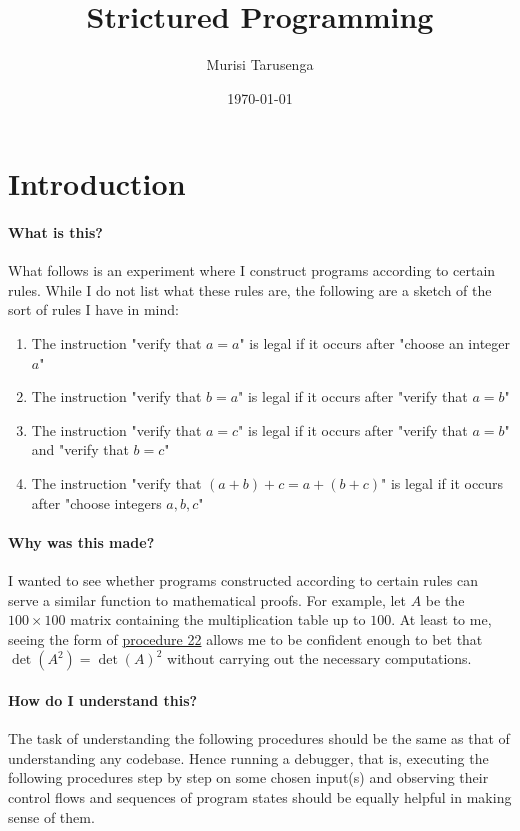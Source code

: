 \documentclass[twocolumn]{article}
\begin{document}
	\title{Strictured Programming}
	\author{Murisi Tarusenga}
	\date{\today{} \currenttime}
	\maketitle
	\section{Introduction}
		\paragraph{What is this?}
			What follows is an experiment where I construct programs according to certain rules. While I do not list what these rules are, the following are a sketch of the sort of rules I have in mind:
			\begin{enumerate}
				\item The instruction "verify that $a=a$" is legal if it occurs after "choose an integer $a$"
				\item The instruction "verify that $b=a$" is legal if it occurs after "verify that $a=b$"
				\item The instruction "verify that $a=c$" is legal if it occurs after "verify that $a=b$" and "verify that $b=c$"
				\item The instruction "verify that $(a+b)+c=a+(b+c)$" is legal if it occurs after "choose integers $a,b,c$"
			\end{enumerate}
		\paragraph{Why was this made?}
			I wanted to see whether programs constructed according to certain rules can serve a similar function to mathematical proofs. For example, let $A$ be the $100\times 100$ matrix containing the multiplication table up to $100$. At least to me, seeing the form of \hyperref[sec:procedure 22]{procedure 22} allows me to be confident enough to bet that $\det(A^2)=\det(A)^2$ without carrying out the necessary computations.
		
		\paragraph{How do I understand this?}
			The task of understanding the following procedures should be the same as that of understanding any codebase. Hence running a debugger, that is, executing the following procedures step by step on some chosen input(s) and observing their control flows and sequences of program states should be equally helpful in making sense of them.
	\tableofcontents
\end{document}
